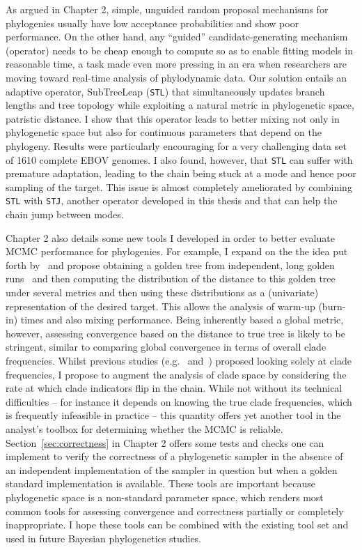 As argued in Chapter 2, simple, unguided random proposal mechanisms for phylogenies usually have low acceptance probabilities and show poor performance.
On the other hand, any ``guided'' candidate-generating mechanism (operator) needs to be cheap enough to compute so as to enable fitting models in reasonable time, a task made even more pressing in an era when researchers are moving toward real-time analysis of phylodynamic data.
Our solution entails an adaptive operator, SubTreeLeap (\verb|STL|) that simultaneously updates branch lengths and tree topology while exploiting a natural metric in phylogenetic space, patristic distance.
I show that this operator leads to better mixing not only in phylogenetic space but also for continuous parameters that depend on the phylogeny.
Results were particularly encouraging for a very challenging data set of 1610 complete EBOV genomes.
I also found, however, that \verb|STL| can suffer with premature adaptation, leading to the chain being stuck at a mode and hence poor sampling of the target.
This issue is almost completely ameliorated by combining \verb|STL| with \verb|STJ|, another operator developed in this thesis and that can help the chain jump between modes.

Chapter 2 also details some new tools I developed in order to better evaluate MCMC performance for phylogenies.
For example, I expand on the the idea put forth by~\cite{Lanfear2016} and propose obtaining a golden tree from independent, long golden runs~\citep{Hoehna2008,Lakner2008} and then computing the distribution of the distance to this golden tree under several metrics and then using these distributions as a (univariate) representation of the desired target.
This allows the analysis of warm-up (burn-in) times and also mixing performance.
Being inherently  based a global metric, however, assessing convergence based on the distance to true tree is likely to be stringent, similar to comparing global convergence in terms of overall clade frequencies.
Whilst previous studies (e.g.~\cite{Lakner2008} and~\cite{Hoehna2008}) proposed looking solely at clade frequencies, I propose to augment the analysis of clade space by considering the rate at which clade indicators flip in the chain.
While not without its technical difficulties -- for instance it depends on knowing the true clade frequencies, which is frequently infeasible in practice -- this quantity offers yet another tool in the analyst's toolbox for determining whether the MCMC is reliable.
Section~\ref{sec:correctness} in Chapter 2 offers some tests and checks one can implement to verify the correctness of a phylogenetic sampler in the absence of an independent implementation of the sampler in question but when a golden standard implementation is available.
These tools are important because phylogenetic space is a non-standard parameter space, which renders most common tools for assessing convergence and correctness partially or completely inappropriate.
I hope these tools can be combined with the existing tool set and used in future Bayesian phylogenetics studies.

